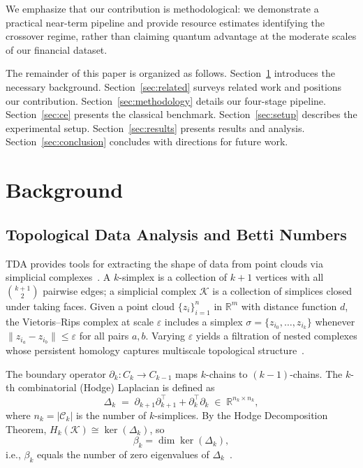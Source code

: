 \documentclass[conference,10pt]{IEEEtran}
\begin{document}
We emphasize that our contribution is methodological: we demonstrate a
practical near-term pipeline and provide resource estimates identifying
the crossover regime, rather than claiming quantum advantage at the
moderate scales of our financial dataset.

The remainder of this paper is organized as
follows. Section~\ref{sec:background} introduces the necessary
background. Section~\ref{sec:related} surveys related work and
positions our contribution. Section~\ref{sec:methodology} details our
four-stage pipeline. Section~\ref{sec:ce} presents the classical
benchmark. Section~\ref{sec:setup} describes the experimental setup.
Section~\ref{sec:results} presents results and analysis.
Section~\ref{sec:conclusion} concludes with directions for future work.

\section{Background}\label{sec:background}

\subsection{Topological Data Analysis and Betti Numbers}

TDA provides tools for extracting the shape of data from point clouds
via simplicial complexes~\cite{Car09, EH10, Otter17}. A $k$-simplex is
a collection of $k+1$ vertices with all $\binom{k+1}{2}$ pairwise
edges; a simplicial complex $\mathcal{K}$ is a collection of simplices
closed under taking faces. Given a point cloud $\{z_i\}_{i=1}^n$ in
$\mathbb{R}^m$ with distance function $d$, the Vietoris--Rips complex
at scale $\varepsilon$ includes a simplex
$\sigma = \{z_{i_0}, \ldots, z_{i_k}\}$ whenever $\|z_{i_a} -
z_{i_b}\| \leq \varepsilon$ for all pairs $a, b$. Varying $\varepsilon$
yields a filtration of nested complexes whose persistent homology
captures multiscale topological structure~\cite{ZC05, Otter17}.

The boundary operator $\partial_k : C_k \to C_{k-1}$ maps $k$-chains to
$(k{-}1)$-chains. The $k$-th combinatorial (Hodge) Laplacian is defined
as
\begin{equation}
    \Delta_k \;=\; \partial_{k+1}\partial_{k+1}^\top
                 + \partial_k^\top \partial_k
    \;\in\; \mathbb{R}^{n_k \times n_k},
    \label{eq:laplacian}
\end{equation}
where $n_k = |\mathcal{C}_k|$ is the number of $k$-simplices. By the
Hodge Decomposition Theorem, $H_k(\mathcal{K}) \cong \ker(\Delta_k)$,
so
\begin{equation}
    \beta_k = \dim \ker(\Delta_k),
    \label{eq:betti}
\end{equation}
i.e., $\beta_k$ equals the number of zero eigenvalues of
$\Delta_k$~\cite{EH10, ZC05}.
\end{document}
